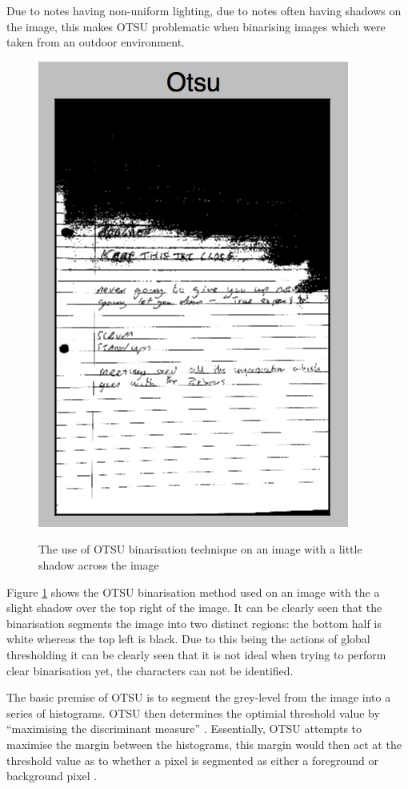 Due to notes having non-uniform lighting, due to notes often having shadows on the image, this makes OTSU problematic when binarising images which were taken from an outdoor environment.

\begin{figure}[H]
  \centering
  \includegraphics{images/OTSU}
  \label{fig:OTSU}
  \caption{The use of OTSU binarisation technique on an image with a little shadow across the image}
\end{figure}

Figure \ref{fig:OTSU} shows the OTSU binarisation method used on an image with the a slight shadow over the top right of the image. It can be clearly seen that the binarisation segments the image into two distinct regions: the bottom half is white whereas the top left is black. Due to this being the actions of global thresholding it can be clearly seen that it is not ideal when trying to perform clear binarisation yet, the characters can not be identified.

The basic premise of OTSU is to segment the grey-level from the image into a series of histograms. OTSU then determines the optimial threshold value by ``maximising the discriminant measure'' \cite{citeulike:2917492}. Essentially, OTSU attempts to maximise the margin between the histograms, this margin would then act at the threshold value as to whether a pixel is segmented as either a foreground or background pixel \cite{citeulike:14021372}.

